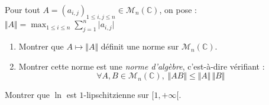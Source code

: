 \documentclass[twoside,a4paper,french,10pt]{VcCours}
\begin{document}
\begin{Exercice}
  Pour tout $A = (a_{i,j})_{1 \leq i,j \leq n} \in \mathcal{M}_{n}(\mathbb{C})$, on pose :
  $\Vert A \Vert = \max_{1 \leq i \leq n} \sum_{j = 1}^{n}  \vert a_{i,j} \vert$
  \begin{enumerate}
  \item Montrer que $A \mapsto \Vert A \Vert$ définit une norme sur $\mathcal{M}_{n}(\mathbb{C})$.
  \item Montrer cette norme est une \textit{norme d'algèbre}, c'est-à-dire vérifiant :
  \[
  \forall A,B \in \mathcal{M}_{n}(\mathbb{C}),  \; \Vert AB \Vert \leq \Vert A \Vert \, \Vert B \Vert
  \]
  \end{enumerate}
\end{Exercice}

\begin{Exercice} 
  Montrer que $\ln$ est $1$-lipschitzienne sur $[1, + \infty[$.
\end{Exercice}



    
\end{document}
